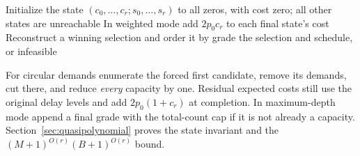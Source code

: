 \begin{algorithm}[H]
\caption{\GradeDP: cumulative-grade interval feasibility or weighted delay}
\label{alg:grade-dp}
Initialize the state $(c_0,\ldots,c_r;s_0,\ldots,s_r)$ to all zeros,
with cost zero; all other states are unreachable\;
In weighted mode add $2p_0c_r$ to each final state's cost\;
Reconstruct a winning selection and order it by grade\;
\KwRet the selection and schedule, or infeasible\;
\end{algorithm}

For circular demands enumerate the forced first candidate, remove
its demands, cut there, and reduce \emph{every} capacity by one.
Residual expected costs still use the original delay levels and add
$2p_0(1+c_r)$ at completion. In maximum-depth mode append a final
grade with the total-count cap if it is not already a capacity.
Section~\ref{sec:quasipolynomial} proves the state invariant and
the $(M+1)^{O(r)}(B+1)^{O(r)}$ bound.
